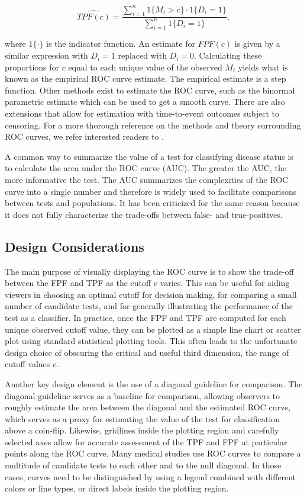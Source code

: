 \documentclass[article]{jss}
\begin{document}
\[ \widehat{TPF(c)} = \frac{\sum_{i = 1}^n 1\{M_i > c\} \cdot 1\{D_i = 1\}}{\sum_{i=1}^n 1\{D_i = 1\}}, \]

where \(1\{\cdot\}\) is the indicator function. An estimate for
\(FPF(c)\) is given by a similar expression with \(D_i = 1\) replaced
with \(D_i = 0\). Calculating these proportions for \(c\) equal to each
unique value of the observed \(M_i\) yields what is known as the
empirical ROC curve estimate. The empirical estimate is a step function.
Other methods exist to estimate the ROC curve, such as the binormal
parametric estimate which can be used to get a smooth curve. There are
also extensions that allow for estimation with time-to-event outcomes
subject to censoring. For a more thorough reference on the methods and
theory surrounding ROC curves, we refer interested readers to
\citet{pepe2003statistical}.

A common way to summarize the value of a test for classifying disease
status is to calculate the area under the ROC curve (AUC). The greater
the AUC, the more informative the test. The AUC summarizes the
complexities of the ROC curve into a single number and therefore is
widely used to facilitate comparisons between tests and populations. It
has been criticized for the same reason because it does not fully
characterize the trade-offs between false- and true-positives.

\subsection{Design Considerations}\label{design-considerations}

The main purpose of visually displaying the ROC curve is to show the
trade-off between the FPF and TPF as the cutoff \(c\) varies. This can
be useful for aiding viewers in choosing an optimal cutoff for decision
making, for comparing a small number of candidate tests, and for
generally illustrating the performance of the test as a classifier. In
practice, once the FPF and TPF are computed for each unique observed
cutoff value, they can be plotted as a simple line chart or scatter plot
using standard statistical plotting tools. This often leads to the
unfortunate design choice of obscuring the critical and useful third
dimension, the range of cutoff values \(c\).

Another key design element is the use of a diagonal guideline for
comparison. The diagonal guideline serves as a baseline for comparison,
allowing observers to roughly estimate the area between the diagonal and
the estimated ROC curve, which serves as a proxy for estimating the
value of the test for classification above a coin-flip. Likewise,
gridlines inside the plotting region and carefully selected axes allow
for accurate assessment of the TPF and FPF at particular points along
the ROC curve. Many medical studies use ROC curves to compare a
multitude of candidate tests to each other and to the null diagonal. In
those cases, curves need to be distinguished by using a legend combined
with different colors or line types, or direct labels inside the
plotting region.
\end{document}
